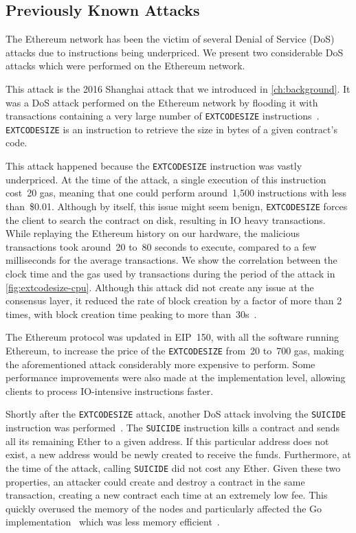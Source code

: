 \subsection{Previously Known Attacks}
The Ethereum network has been the victim of several Denial of Service (DoS) attacks due to instructions being underpriced. We present two considerable DoS attacks which were performed on the Ethereum network.

This attack is the 2016 Shanghai attack that we introduced in \autoref{ch:background}.
It was a DoS attack performed on the Ethereum network by flooding it with transactions containing a very large number of \lstinline{EXTCODESIZE} instructions~\cite{transaction-spam-attack}.
\lstinline{EXTCODESIZE} is an instruction to retrieve the size in bytes of a given contract's code.

This attack happened because the \lstinline{EXTCODESIZE} instruction was vastly underpriced.
At the time of the attack, a single execution of this instruction cost~20 gas, meaning that one could perform around~1,500 instructions with less than~\$0.01.
Although by itself, this issue might seem benign, \lstinline{EXTCODESIZE} forces the client to search the contract on disk, resulting in IO heavy transactions.
While replaying the Ethereum history on our hardware, the malicious transactions took around~20 to~80 seconds to execute, compared to a few milliseconds for the average transactions. We show the correlation between the clock time and the gas used by transactions during the period of the attack in \autoref{fig:extcodesize-cpu}.
Although this attack did not create any issue at the consensus layer, it reduced the rate of block creation by a factor of more than 2 times, with block creation time peaking to more than~30s~\cite{block-time-chart}.

The Ethereum protocol was updated in EIP~150, with all the software running Ethereum, to increase the price of the \lstinline{EXTCODESIZE} from~20 to~700 gas, making the aforementioned attack considerably more expensive to perform. Some performance improvements were also made at the implementation level, allowing clients to process IO-intensive instructions faster.

Shortly after the \lstinline{EXTCODESIZE} attack, another DoS attack involving the \lstinline{SUICIDE} instruction was performed~\cite{suicide-attack}. The \lstinline{SUICIDE} instruction kills a contract and sends all its remaining Ether to a given address. If this particular address does not exist, a new address would be newly created to receive the funds. Furthermore, at the time of the attack, calling \lstinline{SUICIDE} did not cost any Ether. Given these two properties, an attacker could create and destroy a contract in the same transaction, creating a new contract each time at an extremely low fee. This quickly overused the memory of the nodes and particularly affected the Go implementation~\cite{geth} which was less memory efficient~\cite{geth-memory-efficiency}.

